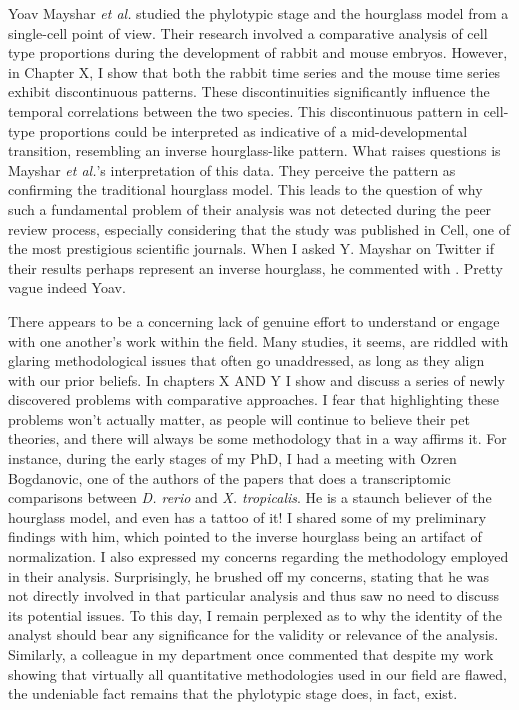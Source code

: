 Yoav Mayshar \textit{et al.} studied the phylotypic stage and the hourglass model from a single-cell point of view\cite{Mayshar2023}. Their research involved a comparative analysis of cell type proportions during the development of rabbit and mouse embryos. However, in Chapter X, I show that both the rabbit time series and the mouse time series exhibit discontinuous patterns. These discontinuities significantly influence the temporal correlations between the two species. This discontinuous pattern in cell-type proportions could be interpreted as indicative of a mid-developmental transition, resembling an inverse hourglass-like pattern. What raises questions is Mayshar \textit{et al.}'s interpretation of this data. They perceive the pattern as confirming the traditional hourglass model. This leads to the question of why such a fundamental problem of their analysis was not detected during the peer review process, especially considering that the study was published in Cell, one of the most prestigious scientific journals. When I asked Y. Mayshar on Twitter if their results perhaps represent an inverse hourglass, he commented with . Pretty vague indeed Yoav.

There appears to be a concerning lack of genuine effort to understand or engage with one another's work within the field. Many studies, it seems, are riddled with glaring methodological issues that often go unaddressed, as long as they align with our prior beliefs. In chapters X AND Y I show and discuss a series of newly discovered problems with comparative approaches. I fear that highlighting these problems won't actually matter, as people will continue to believe their pet theories, and there will always be some methodology that in a way affirms it. For instance, during the early stages of my PhD, I had a meeting with Ozren Bogdanovic, one of the authors of the papers that does a transcriptomic comparisons between \textit{D. rerio} and \textit{X. tropicalis}. He is a staunch believer of the hourglass model, and even has a tattoo of it! I shared some of my preliminary findings with him, which pointed to the inverse hourglass being an artifact of normalization. I also expressed my concerns regarding the methodology employed in their analysis. Surprisingly, he brushed off my concerns, stating that he was not directly involved in that particular analysis and thus saw no need to discuss its potential issues. To this day, I remain perplexed as to why the identity of the analyst should bear any significance for the validity or relevance of the analysis. Similarly, a colleague in my department once commented that despite my work showing that virtually all quantitative methodologies used in our field are flawed, the undeniable fact remains that the phylotypic stage does, in fact, exist.

